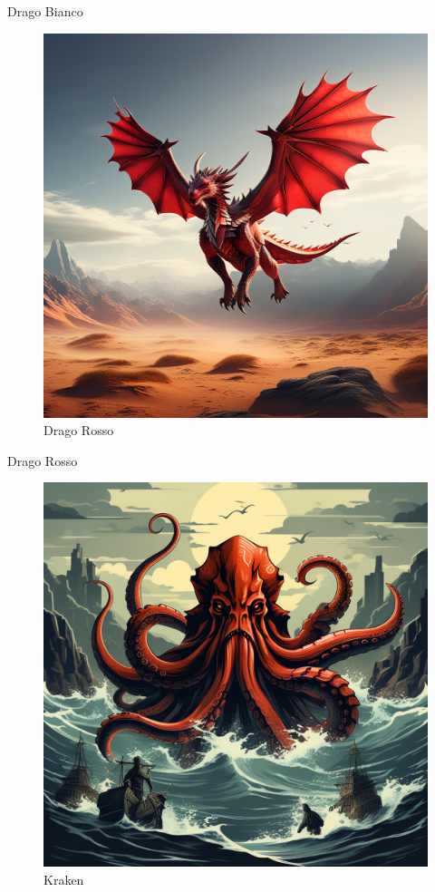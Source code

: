 Drago Bianco

\begin{figure}
\centering
\includegraphics{create-an-image-of-a-red-dragon-flying-over-a-desert-with-the-stylised-style-of-medieval-bestiaries- 1.png}
\caption{Drago Rosso}
\end{figure}

Drago Rosso

\begin{figure}
\centering
\includegraphics{create-an-image-of-a-kraken-roaming-the-sea-with-the-stylised-style-of-medieval-bestiaries-.png}
\caption{Kraken}
\end{figure}

